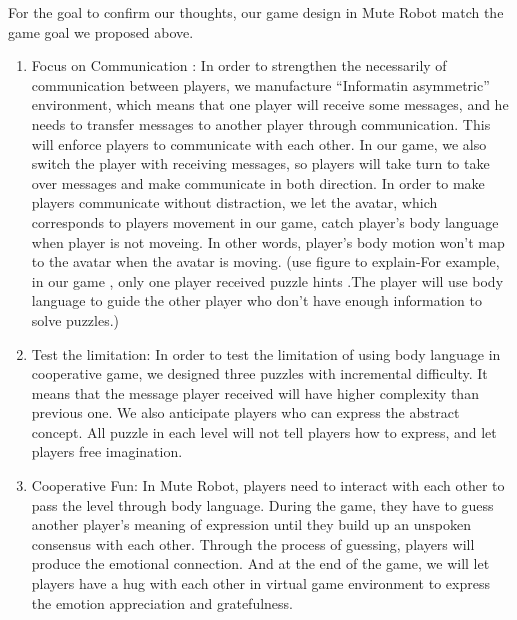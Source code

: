 \documentclass{sigchi}
\begin{document}
For the goal to confirm our thoughts, our game design in Mute Robot match the game goal we proposed above.
\begin{enumerate}
\item Focus on Communication : 
In order to strengthen the necessarily of communication between players, we manufacture ``Informatin asymmetric'' environment, which means that one player will receive some messages, and he needs to transfer messages to another player through communication. This will enforce players to communicate with each other. In our game, we also switch the player with receiving messages, so players will take turn to take over messages and make communicate in both direction. In order to make players communicate without distraction, we let the avatar, which corresponds to players movement in our game, catch player's body language when player is not moveing. In other words, player's body motion won't map to the avatar when the avatar is moving.
(use figure to explain-For example, in our game , only one player received puzzle hints .The player will use body language to guide the other player who don’t have enough information to solve puzzles.)
\item Test the limitation: In order to test the limitation of using body language in cooperative game, we designed three puzzles with incremental difficulty. It means that the message player received will have higher complexity than previous one.
We also anticipate players who can express the abstract concept. All puzzle in each level will not tell players how to express, and let players free imagination.
\item Cooperative Fun: 
In Mute Robot, players need to interact with each other to pass the level through body language. During the game, they have to guess another player's meaning of expression until they build up an unspoken consensus with each other. Through the process of guessing, players will produce the emotional connection. And at the end of the game, we will let players have a hug with each other in virtual game environment to express the emotion appreciation and gratefulness.

\end{enumerate}
\end{document}
